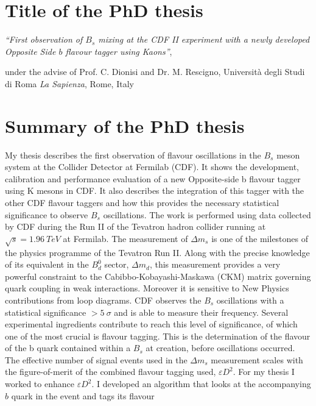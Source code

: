 \documentclass{article}
\begin{document}
\begin{vita}
\section*{Title of the PhD thesis}
                 \large{{\it ``First observation of $B_{s}$ mixing at the CDF II experiment with 
                    a newly developed Opposite Side $b$ flavour tagger using Kaons''}},

                 under the advise of Prof. C. Dionisi and Dr. M. Rescigno,
                 Universit\`a degli Studi di Roma {\em La Sapienza}, Rome, Italy \\ 

\section*{Summary of the PhD thesis}
My thesis describes the first observation of flavour oscillations in the $B_{s}$ meson system at the Collider
Detector at Fermilab (CDF). It shows the development, calibration and performance evaluation of
a new Opposite-side b flavour tagger using K mesons in CDF. It also describes the integration of this tagger 
 with the other CDF flavour taggers and how this provides the necessary statistical significance to observe
$B_{s}$ oscillations. The work is performed using data collected by CDF during the Run II of the Tevatron 
hadron collider running at $\sqrt{s} = 1.96~TeV$ at Fermilab. The measurement of $\Delta m_{s}$ is one 
of the milestones of the physics programme of the Tevatron Run II. 
Along with the precise knowledge of its equivalent in the
$B^{0}_{d}$ sector, $\Delta m_{d}$, this measurement provides a very powerful constraint to the
Cabibbo-Kobayashi-Maskawa (CKM) matrix governing quark coupling in weak
interactions. 
Moreover it is sensitive to New Physics contributions from loop diagrams.
CDF observes the $B_s$ oscillations with a statistical significance $>5~\sigma$ 
and is able to measure their frequency. Several experimental ingredients 
contribute to reach this level of significance, of which one of the most crucial is
flavour tagging. This is the determination of the flavour of
the b quark contained within a $B_s$ at creation, before oscillations occurred. 
The effective number of signal events used in the $\Delta m_{s}$ measurement
scales with the figure-of-merit of the combined flavour tagging used, $\varepsilon D^{2}$. 
For my thesis I worked to enhance $\varepsilon D^{2}$. 
I developed an algorithm that looks at the accompanying $b$ quark in the event and tags its flavour 

\end{vita}
\end{document}
